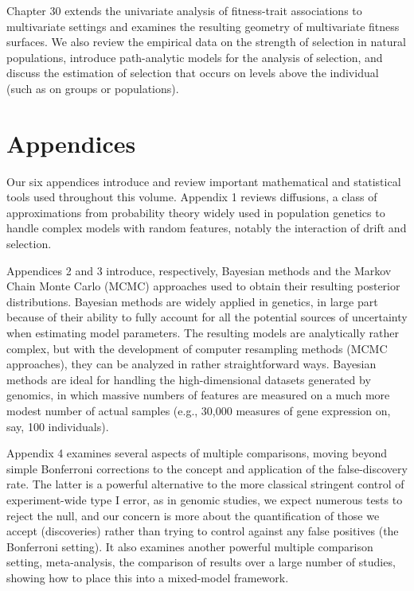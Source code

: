 \documentclass{article}
\begin{document}
Chapter 30 extends the univariate analysis of fitness-trait associations to multivariate settings and examines the resulting geometry of multivariate fitness surfaces. We also review the empirical data on the strength of selection in natural populations, introduce path-analytic models for the analysis of selection, and discuss the estimation of selection that occurs on levels above the individual (such as on groups or populations).

\section{Appendices}
Our six appendices introduce and review important mathematical and statistical tools used throughout this volume. Appendix 1 reviews diffusions, a class of approximations from probability theory widely used in population genetics to handle complex models with random features, notably the interaction of drift and selection.

Appendices 2 and 3 introduce, respectively, Bayesian methods and the Markov Chain Monte Carlo (MCMC) approaches used to obtain their resulting posterior distributions. Bayesian methods are widely applied in genetics, in large part because of their ability to fully account for all the potential sources of uncertainty when estimating model parameters. The resulting models are analytically rather complex, but with the development of computer resampling methods (MCMC approaches), they can be analyzed in rather straightforward ways. Bayesian methods are ideal for handling the high-dimensional datasets generated by genomics, in which massive numbers of features are measured on a much more modest number of actual samples (e.g., 30,000 measures of gene expression on, say, 100 individuals).

Appendix 4 examines several aspects of multiple comparisons, moving beyond simple Bonferroni corrections to the concept and application of the false-discovery rate. The latter is a powerful alternative to the more classical stringent control of experiment-wide type I error, as in genomic studies, we expect numerous tests to reject the null, and our concern is more about the quantification of those we accept (discoveries) rather than trying to control against any false positives (the Bonferroni setting). It also examines another powerful multiple comparison setting, meta-analysis, the comparison of results over a large number of studies, showing how to place this into a mixed-model framework.
\end{document}
